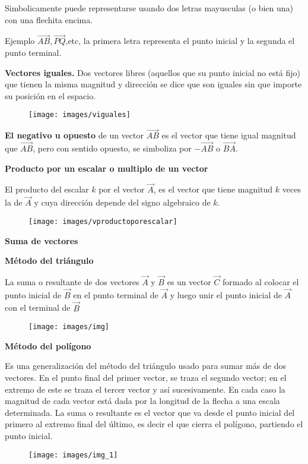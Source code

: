 Simbolicamente puede representarse usando dos letras mayusculas (o bien una) con una flechita encima.

Ejemplo $\overrightarrow{AB}, \overrightarrow{PQ}$,etc, la primera letra representa el punto inicial y la segunda el punto terminal.

\textbf{Vectores iguales.} Dos vectores libres (aquellos que su punto inicial no está fijo) que tienen la misma magnitud y dirección se dice que son iguales sin que importe su posición en el espacio.

\begin{figure}[H]
    \centering
    \texttt{[image: images/viguales]}
\end{figure}

\textbf{El negativo u opuesto} de un vector $\overrightarrow{AB}$ es el vector que tiene igual magnitud que $\overrightarrow{AB}$, pero con sentido opuesto, se simboliza por $- \overrightarrow{AB}$ o $\overrightarrow{BA}$.

\textbf{Producto por un escalar o multiplo de un vector}

El producto del escalar $k$ por el vector $\overrightarrow{A}$, es el vector que tiene magnitud $k$ veces la de $\overrightarrow{A}$ y cuya dirección depende del signo algebraico de $k$.
\begin{figure}[H]
    \centering
    \texttt{[image: images/vproductoporescalar]}
\end{figure}



\textbf{Suma de vectores}


\textbf{Método del triángulo}

La suma o resultante de dos vectores $\overrightarrow{A}$ y $\overrightarrow{B}$ es un vector $\overrightarrow{C}$ formado al colocar el punto inicial de $\overrightarrow{B}$ en el punto terminal de $\overrightarrow{A}$ y luego unir el punto inicial de $\overrightarrow{A}$ con el terminal de $\overrightarrow{B}$
\begin{figure}[H]
    \centering
    \texttt{[image: images/img]}
\end{figure}


\textbf{Método del polígono}

Es una generalización del método del triángulo usado para sumar más de dos vectores.
En el punto final del primer vector, se traza el segundo vector; en el extremo de este se traza el tercer vector y así sucesivamente.
En cada caso la magnitud de cada vector está dada por la longitud de la flecha a una escala determinada.
La suma o resultante es el vector que va desde el punto inicial del primero al extremo final del último, es decir el que cierra el polígono, partiendo el punto inicial.

\begin{figure}[H]
    \centering
    \texttt{[image: images/img\_1]}
\end{figure}
